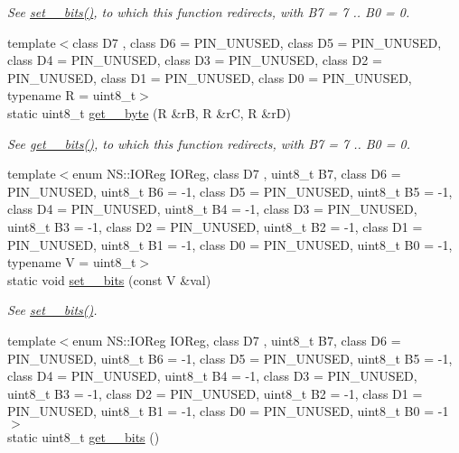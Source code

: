 \begin{DoxyCompactItemize}
\begin{DoxyCompactList}\small\item\em See \hyperlink{namespaceports_aac15fb87d8fede3f2bf8d764ab42965f}{set\+\_\+\_\+bits()}, to which this function redirects, with {\ttfamily B7 = 7} .. {\ttfamily B0 = 0}. \end{DoxyCompactList}\item 
{\footnotesize template$<$class D7 , class D6  = P\+I\+N\+\_\+\+U\+N\+U\+S\+ED, class D5  = P\+I\+N\+\_\+\+U\+N\+U\+S\+ED, class D4  = P\+I\+N\+\_\+\+U\+N\+U\+S\+ED, class D3  = P\+I\+N\+\_\+\+U\+N\+U\+S\+ED, class D2  = P\+I\+N\+\_\+\+U\+N\+U\+S\+ED, class D1  = P\+I\+N\+\_\+\+U\+N\+U\+S\+ED, class D0  = P\+I\+N\+\_\+\+U\+N\+U\+S\+ED, typename R  = uint8\+\_\+t$>$ }\\static uint8\+\_\+t \hyperlink{namespaceports_ae7d1ffc9ed6454ca61b006ffe43e4e6e}{get\+\_\+\_\+byte} (R \&rB, R \&rC, R \&rD)
\begin{DoxyCompactList}\small\item\em See \hyperlink{namespaceports_a9a1959ec95780c00a964b174a27b2a37}{get\+\_\+\_\+bits()}, to which this function redirects, with {\ttfamily B7 = 7} .. {\ttfamily B0 = 0}. \end{DoxyCompactList}\item 
{\footnotesize template$<$enum N\+S\+::\+I\+O\+Reg I\+O\+Reg, class D7 , uint8\+\_\+t B7, class D6  = P\+I\+N\+\_\+\+U\+N\+U\+S\+ED, uint8\+\_\+t B6 = -\/1, class D5  = P\+I\+N\+\_\+\+U\+N\+U\+S\+ED, uint8\+\_\+t B5 = -\/1, class D4  = P\+I\+N\+\_\+\+U\+N\+U\+S\+ED, uint8\+\_\+t B4 = -\/1, class D3  = P\+I\+N\+\_\+\+U\+N\+U\+S\+ED, uint8\+\_\+t B3 = -\/1, class D2  = P\+I\+N\+\_\+\+U\+N\+U\+S\+ED, uint8\+\_\+t B2 = -\/1, class D1  = P\+I\+N\+\_\+\+U\+N\+U\+S\+ED, uint8\+\_\+t B1 = -\/1, class D0  = P\+I\+N\+\_\+\+U\+N\+U\+S\+ED, uint8\+\_\+t B0 = -\/1, typename V  = uint8\+\_\+t$>$ }\\static void \hyperlink{namespaceports_ac9262ca010e65ff684986eef2900942f}{set\+\_\+\_\+bits} (const V \&val)
\begin{DoxyCompactList}\small\item\em See \hyperlink{namespaceports_aac15fb87d8fede3f2bf8d764ab42965f}{set\+\_\+\_\+bits()}. \end{DoxyCompactList}\item 
{\footnotesize template$<$enum N\+S\+::\+I\+O\+Reg I\+O\+Reg, class D7 , uint8\+\_\+t B7, class D6  = P\+I\+N\+\_\+\+U\+N\+U\+S\+ED, uint8\+\_\+t B6 = -\/1, class D5  = P\+I\+N\+\_\+\+U\+N\+U\+S\+ED, uint8\+\_\+t B5 = -\/1, class D4  = P\+I\+N\+\_\+\+U\+N\+U\+S\+ED, uint8\+\_\+t B4 = -\/1, class D3  = P\+I\+N\+\_\+\+U\+N\+U\+S\+ED, uint8\+\_\+t B3 = -\/1, class D2  = P\+I\+N\+\_\+\+U\+N\+U\+S\+ED, uint8\+\_\+t B2 = -\/1, class D1  = P\+I\+N\+\_\+\+U\+N\+U\+S\+ED, uint8\+\_\+t B1 = -\/1, class D0  = P\+I\+N\+\_\+\+U\+N\+U\+S\+ED, uint8\+\_\+t B0 = -\/1$>$ }\\static uint8\+\_\+t \hyperlink{namespaceports_a2a0a17506421aaa10b7c087124a09b72}{get\+\_\+\_\+bits} ()

\end{DoxyCompactItemize}
